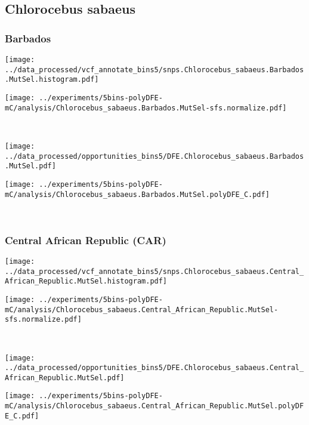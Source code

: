 \subsection{Chlorocebus sabaeus}

\subsubsection{Barbados}

\begin{minipage}{0.49\linewidth}
    \texttt{[image: ../data\_processed/vcf\_annotate\_bins5/snps.Chlorocebus\_sabaeus.Barbados.MutSel.histogram.pdf]}
\end{minipage}
\begin{minipage}{0.49\linewidth}
    \texttt{[image: ../experiments/5bins-polyDFE-mC/analysis/Chlorocebus\_sabaeus.Barbados.MutSel-sfs.normalize.pdf]}
\end{minipage}
\\
\begin{minipage}{0.49\linewidth}
    \texttt{[image: ../data\_processed/opportunities\_bins5/DFE.Chlorocebus\_sabaeus.Barbados.MutSel.pdf]}
\end{minipage}
\begin{minipage}{0.49\linewidth}
    \texttt{[image: ../experiments/5bins-polyDFE-mC/analysis/Chlorocebus\_sabaeus.Barbados.MutSel.polyDFE\_C.pdf]}
\end{minipage}
\\

\subsubsection{Central African Republic (CAR)}

\begin{minipage}{0.49\linewidth}
    \texttt{[image: ../data\_processed/vcf\_annotate\_bins5/snps.Chlorocebus\_sabaeus.Central\_African\_Republic.MutSel.histogram.pdf]}
\end{minipage}
\begin{minipage}{0.49\linewidth}
    \texttt{[image: ../experiments/5bins-polyDFE-mC/analysis/Chlorocebus\_sabaeus.Central\_African\_Republic.MutSel-sfs.normalize.pdf]}
\end{minipage}
\\
\begin{minipage}{0.49\linewidth}
    \texttt{[image: ../data\_processed/opportunities\_bins5/DFE.Chlorocebus\_sabaeus.Central\_African\_Republic.MutSel.pdf]}
\end{minipage}
\begin{minipage}{0.49\linewidth}
    \texttt{[image: ../experiments/5bins-polyDFE-mC/analysis/Chlorocebus\_sabaeus.Central\_African\_Republic.MutSel.polyDFE\_C.pdf]}
\end{minipage}
\\

